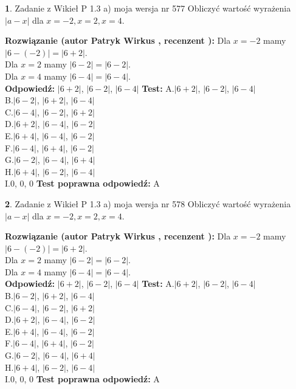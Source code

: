 \documentclass[12pt, a4paper]{article}
\theoremstyle{definition} %
\newtheorem{zad}{}
\newcommand{\zadStart}[1]{\begin{zad}#1\newline}
\newcommand{\zadStop}{\end{zad}}
\newcommand{\rozwStart}[2]{\noindent \textbf{Rozwiązanie (autor #1 , recenzent #2): }\newline}
\newcommand{\rozwStop}{\newline}
\newcommand{\odpStart}{\noindent \textbf{Odpowiedź:}\newline}
\newcommand{\odpStop}{\newline}
\newcommand{\testStart}{\noindent \textbf{Test:}\newline}
\newcommand{\testStop}{\newline}
\newcommand{\kluczStart}{\noindent \textbf{Test poprawna odpowiedź:}\newline}
\newcommand{\kluczStop}{\newline}
\begin{document}
\zadStart{Zadanie z Wikieł P 1.3 a) moja wersja nr 577}
Obliczyć wartość wyrażenia $|a - x|$ dla $x=-2,x=2,x=4$.
\zadStop
\rozwStart{Patryk Wirkus}{}
Dla $x = -2$ mamy $|6 - (-2)| = |6 + 2|$.\\
Dla $x = 2$ mamy $|6 - 2| = |6 - 2|$.\\
Dla $x = 4$ mamy $|6 - 4| = |6 - 4|$.\\
\rozwStop
\odpStart
$|6 + 2|$, $|6 - 2|$, $|6 - 4|$
\odpStop
\testStart
A.$|6 + 2|$, $|6 - 2|$, $|6 - 4|$\\
B.$|6 - 2|$, $|6 + 2|$, $|6 - 4|$\\
C.$|6 - 4|$, $|6 - 2|$, $|6 + 2|$\\
D.$|6 + 2|$, $|6 - 4|$, $|6 - 2|$\\
E.$|6 + 4|$, $|6 - 4|$, $|6 - 2|$\\
F.$|6 - 4|$, $|6 + 4|$, $|6 - 2|$\\
G.$|6 - 2|$, $|6 - 4|$, $|6 + 4|$\\
H.$|6 + 4|$, $|6 - 2|$, $|6 - 4|$\\
I.$0$, $0$, $0$
\testStop
\kluczStart
A
\kluczStop



\zadStart{Zadanie z Wikieł P 1.3 a) moja wersja nr 578}
Obliczyć wartość wyrażenia $|a - x|$ dla $x=-2,x=2,x=4$.
\zadStop
\rozwStart{Patryk Wirkus}{}
Dla $x = -2$ mamy $|6 - (-2)| = |6 + 2|$.\\
Dla $x = 2$ mamy $|6 - 2| = |6 - 2|$.\\
Dla $x = 4$ mamy $|6 - 4| = |6 - 4|$.\\
\rozwStop
\odpStart
$|6 + 2|$, $|6 - 2|$, $|6 - 4|$
\odpStop
\testStart
A.$|6 + 2|$, $|6 - 2|$, $|6 - 4|$\\
B.$|6 - 2|$, $|6 + 2|$, $|6 - 4|$\\
C.$|6 - 4|$, $|6 - 2|$, $|6 + 2|$\\
D.$|6 + 2|$, $|6 - 4|$, $|6 - 2|$\\
E.$|6 + 4|$, $|6 - 4|$, $|6 - 2|$\\
F.$|6 - 4|$, $|6 + 4|$, $|6 - 2|$\\
G.$|6 - 2|$, $|6 - 4|$, $|6 + 4|$\\
H.$|6 + 4|$, $|6 - 2|$, $|6 - 4|$\\
I.$0$, $0$, $0$
\testStop
\kluczStart
A
\kluczStop
\end{document}
